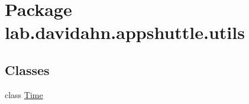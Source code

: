 \hypertarget{namespacelab_1_1davidahn_1_1appshuttle_1_1utils}{\section{\-Package lab.\-davidahn.\-appshuttle.\-utils}
\label{namespacelab_1_1davidahn_1_1appshuttle_1_1utils}
}
\subsection*{\-Classes}
\begin{DoxyCompactItemize}
\item 
class \hyperlink{classlab_1_1davidahn_1_1appshuttle_1_1utils_1_1_time}{\-Time}
\end{DoxyCompactItemize}
